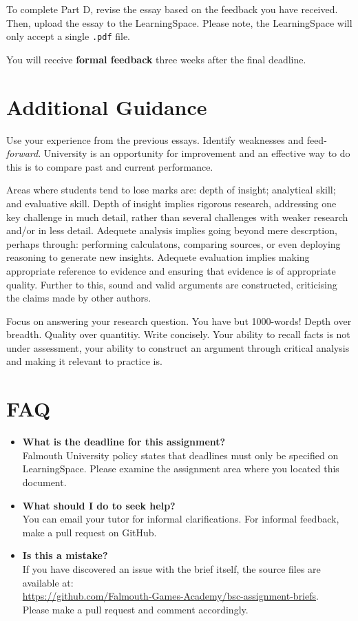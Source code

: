 \documentclass{../fal_assignment}
\begin{document}
To complete Part D, revise the essay based on the feedback you have received. Then, upload the essay to the LearningSpace. Please note, the LearningSpace will only accept a single \texttt{.pdf} file.

You will receive \textbf{formal feedback} three weeks after the final deadline.

\section*{Additional Guidance}

Use your experience from the previous essays. Identify weaknesses and feed-\textit{forward}. University is an opportunity for improvement and an effective way to do this is to compare past and current performance.

Areas where students tend to lose marks are: depth of insight; analytical skill; and evaluative skill. Depth of insight implies rigorous research, addressing one key challenge in much detail, rather than several challenges with weaker research and/or in less detail. Adequete analysis implies going beyond mere descrption, perhaps through: performing calculatons, comparing sources, or even deploying reasoning to generate new insights. Adequete evaluation implies making appropriate reference to evidence and ensuring that evidence is of appropriate quality. Further to this, sound and valid arguments are constructed, criticising the claims made by other authors.

Focus on answering your research question. You have but 1000-words! Depth over breadth. Quality over quantitiy. Write concisely. Your ability to recall facts is not under assessment, your ability to construct an argument through critical analysis and making it relevant to practice is.

\section*{FAQ}

\begin{itemize}
	\item 	\textbf{What is the deadline for this assignment?} \\ 
    		Falmouth University policy states that deadlines must only be specified on LearningSpace. Please examine the assignment area where you located this document.
    		
	\item 	\textbf{What should I do to seek help?} \\ 
    		You can email your tutor for informal clarifications. For informal feedback, make a pull request on GitHub. 
    		
    	\item 	\textbf{Is this a mistake?} \\ 	
    		If you have discovered an issue with the brief itself, the source files are available at: \\
    		\url{https://github.com/Falmouth-Games-Academy/bsc-assignment-briefs}.\\
    		 Please make a pull request and comment accordingly.
\end{itemize}
\end{document}
